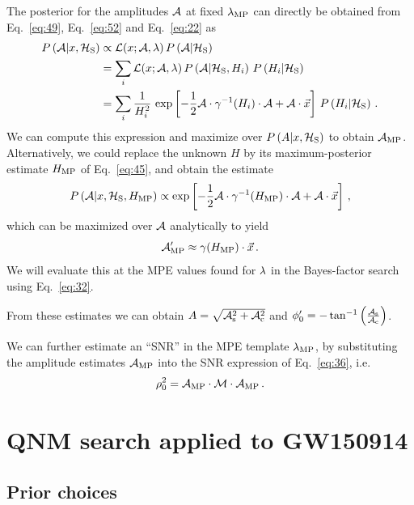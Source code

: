 \documentclass[aps,prd,onecolumn,notitlepage,nofootinbib,superscriptaddress,altaffilletter,floatfix]{revtex4-1}
\begin{document}
The posterior for the amplitudes ${\mathcal A}$ at fixed $\lambda_{\mathrm{MP}}$ can directly be obtained from Eq.~\eqref{eq:49}, Eq.~\eqref{eq:52} and Eq.~\eqref{eq:22} as
\begin{align}
  \label{eq:51}
  P\left({\mathcal A}\middle|x,\mathcal{H}_{\mathrm{S}}\right) &\propto \mathcal{L}(x;{\mathcal A},\lambda)\,P\left({\mathcal A}\middle|\mathcal{H}_{\mathrm{S}}\right) \\
  &= \sum_i \mathcal{L}(x;{\mathcal A},\lambda)\,P\left({\mathcal A}\middle|\mathcal{H}_{\mathrm{S}},H_i\right)\,P\left(H_i\middle|\mathcal{H}_{\mathrm{S}}\right)\,\\
  &= \sum_i \frac{1}{H_i^2}\,\exp\left[ -\frac{1}{2}{\mathcal A}\cdot\gamma^{-1}(H_i)\cdot{\mathcal A} + {\mathcal A}\cdot\vec{x} \right]\,P\left(H_i\middle|\mathcal{H}_{\mathrm{S}}\right)\,.
\end{align}
We can compute this expression and maximize over $P\left(A\middle|x,\mathcal{H}_{\mathrm{S}}\right)$ to obtain ${\mathcal A}_{\mathrm{MP}}$.
Alternatively, we could replace the unknown $H$ by its maximum-posterior estimate $H_{\mathrm{MP}}$ of Eq.~\eqref{eq:45}, and obtain the estimate
\begin{equation}
  \label{eq:53}
  P\left({\mathcal A}\middle|x,\mathcal{H}_{\mathrm{S}},H_{\mathrm{MP}}\right) \propto \exp\left[ -\frac{1}{2}{\mathcal A}\cdot\gamma^{-1}(H_{\mathrm{MP}})\cdot{\mathcal A} + {\mathcal A}\cdot\vec{x} \right]\,,
\end{equation}
which can be maximized over ${\mathcal A}$ analytically to yield
\begin{equation}
  \label{eq:31}
  {\mathcal A}_{\mathrm{MP}}' \approx \gamma(H_{\mathrm{MP}})\cdot\vec{x}\,.
\end{equation}
We will evaluate this at the MPE values found for $\lambda$ in the Bayes-factor search using Eq.~\eqref{eq:32}.

From these estimates we can obtain $A = \sqrt{{\mathcal A}_{\mathrm{s}}^2+{\mathcal A}_{\mathrm{c}}^2}$ and $\phi_0' = - \tan^{-1}\left(\frac{{\mathcal A}_{\mathrm{s}}}{{\mathcal A}_{\mathrm{c}}}\right)$.

We can further estimate an ``SNR'' in the MPE template $\lambda_{\mathrm{MP}}$, by substituting the amplitude estimates ${\mathcal A}_{\mathrm{MP}}$ into the SNR expression of
Eq.~\eqref{eq:36}, i.e.\
\begin{equation}
  \label{eq:20}
  \rho_0^2 = {\mathcal A}_{\mathrm{MP}}\cdot\mathcal{M}\cdot{\mathcal A}_{\mathrm{MP}}\,.
\end{equation}

\section{QNM search applied to GW150914}
\label{sec:qnm-search-applied}

\subsection{Prior choices}
\label{sec:prior-choices}
\end{document}

